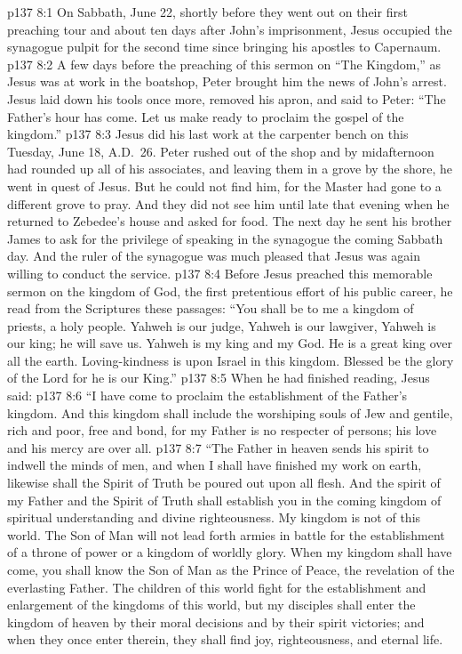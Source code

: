\vs p137 8:1 On Sabbath, June 22, shortly before they went out on their first preaching tour and about ten days after John’s imprisonment, Jesus occupied the synagogue pulpit for the second time since bringing his apostles to Capernaum.
\vs p137 8:2 A few days before the preaching of this sermon on “The Kingdom,” as Jesus was at work in the boatshop, Peter brought him the news of John’s arrest. Jesus laid down his tools once more, removed his apron, and said to Peter: \textcolor{ubdarkred}{“The Father’s hour has come. Let us make ready to proclaim the gospel of the kingdom.”}
\vs p137 8:3 Jesus did his last work at the carpenter bench on this Tuesday, June 18, A.D.~26. Peter rushed out of the shop and by midafternoon had rounded up all of his associates, and leaving them in a grove by the shore, he went in quest of Jesus. But he could not find him, for the Master had gone to a different grove to pray. And they did not see him until late that evening when he returned to Zebedee’s house and asked for food. The next day he sent his brother James to ask for the privilege of speaking in the synagogue the coming Sabbath day. And the ruler of the synagogue was much pleased that Jesus was again willing to conduct the service.
\pc \vs p137 8:4 Before Jesus preached this memorable sermon on the kingdom of God, the first pretentious effort of his public career, he read from the Scriptures these passages: \textcolor{ubdarkred}{“You shall be to me a kingdom of priests, a holy people. Yahweh is our judge, Yahweh is our lawgiver, Yahweh is our king; he will save us. Yahweh is my king and my God. He is a great king over all the earth. Loving\hyp{}kindness is upon Israel in this kingdom. Blessed be the glory of the Lord for he is our King.”}
\vs p137 8:5 When he had finished reading, Jesus said:
\pc \vs p137 8:6 \textcolor{ubdarkred}{“I have come to proclaim the establishment of the Father’s kingdom. And this kingdom shall include the worshiping souls of Jew and gentile, rich and poor, free and bond, for my Father is no respecter of persons; his love and his mercy are over all.}
\vs p137 8:7 \textcolor{ubdarkred}{“The Father in heaven sends his spirit to indwell the minds of men, and when I shall have finished my work on earth, likewise shall the Spirit of Truth be poured out upon all flesh. And the spirit of my Father and the Spirit of Truth shall establish you in the coming kingdom of spiritual understanding and divine righteousness. My kingdom is not of this world. The Son of Man will not lead forth armies in battle for the establishment of a throne of power or a kingdom of worldly glory. When my kingdom shall have come, you shall know the Son of Man as the Prince of Peace, the revelation of the everlasting Father. The children of this world fight for the establishment and enlargement of the kingdoms of this world, but my disciples shall enter the kingdom of heaven by their moral decisions and by their spirit victories; and when they once enter therein, they shall find joy, righteousness, and eternal life.}
